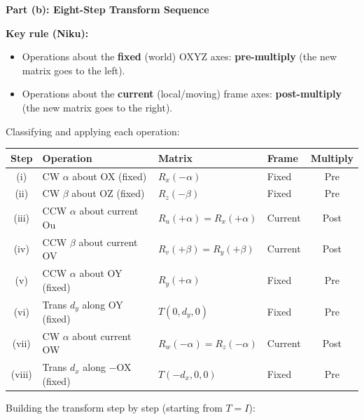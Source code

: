 \documentclass[12pt,a3paper]{article}
\begin{document}
\begin{enumerate}
\begin{tcolorbox}[enhanced,breakable,ansbox,colback=cB!4,colframe=cB,
  boxrule=0.8pt,arc=5pt,
  title={\textbf{Answer}},fonttitle=\bfseries\color{white},
  colbacktitle=cB]
\medskip
\textbf{Part (b): Eight-Step Transform Sequence}

\medskip
\textbf{Key rule (Niku):}
\begin{itemize}[leftmargin=1.5em, itemsep=2pt]
  \item Operations about the \textbf{fixed} (world) OXYZ axes:
    \textbf{pre-multiply} (the new matrix goes to the left).
  \item Operations about the \textbf{current} (local/moving) frame axes:
    \textbf{post-multiply} (the new matrix goes to the right).
\end{itemize}

\medskip
Classifying and applying each operation:

\begin{center}
\small
\begin{tabular}{@{}clllc@{}}
\toprule
\textbf{Step} & \textbf{Operation} & \textbf{Matrix} & \textbf{Frame} & \textbf{Multiply}\\
\midrule
(i)   & CW $\alpha$ about OX (fixed)         & $R_x(-\alpha)$   & Fixed   & Pre  \\
(ii)  & CW $\beta$ about OZ (fixed)          & $R_z(-\beta)$    & Fixed   & Pre  \\
(iii) & CCW $\alpha$ about current Ou        & $R_u(+\alpha)=R_x(+\alpha)$  & Current & Post \\
(iv)  & CCW $\beta$ about current OV         & $R_v(+\beta)=R_y(+\beta)$   & Current & Post \\
(v)   & CCW $\alpha$ about OY (fixed)        & $R_y(+\alpha)$   & Fixed   & Pre  \\
(vi)  & Trans $d_y$ along OY (fixed)         & $T(0,d_y,0)$     & Fixed   & Pre  \\
(vii) & CW $\alpha$ about current OW         & $R_w(-\alpha)=R_z(-\alpha)$  & Current & Post \\
(viii)& Trans $d_x$ along $-$OX (fixed)      & $T(-d_x,0,0)$    & Fixed   & Pre  \\
\bottomrule
\end{tabular}
\end{center}

Building the transform step by step (starting from $T = I$):


\end{tcolorbox}
\end{enumerate}
\end{document}
